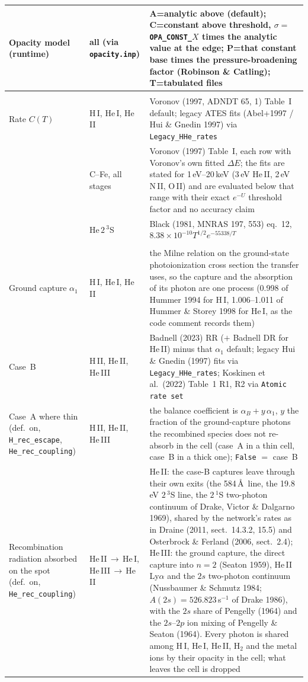 \documentclass[english,a4paper]{my_memo}
\begin{document}
\begin{longtable}{@{}>{\raggedright\arraybackslash\hyphenpenalty=10000\exhyphenpenalty=10000}p{}p{}p{}@{}}
Opacity model (runtime) & all (via \texttt{opacity.inp}) & A=analytic above (default); C=constant above threshold, $\sigma =$ \texttt{OPA\_CONST\_}$X$ times the analytic value at the edge; P=that constant base times the pressure-broadening factor (Robinson \& Catling); T=tabulated files \\
\midrule
\multicolumn{3}{@{}l}{\textbf{Collisional (electron-impact) ionization}}\\[2pt]
Rate $C(T)$ & H\,I, He\,I, He\,II & Voronov (1997, ADNDT 65, 1) Table~I default; legacy ATES fits (Abel+1997 / Hui \& Gnedin 1997) via \texttt{Legacy\_HHe\_rates} \\
 & C--Fe, all stages & Voronov (1997) Table~I, each row with Voronov's own fitted $\Delta E$; the fits are stated for 1\,eV--20\,keV (3\,eV He\,II, 2\,eV N\,II, O\,II) and are evaluated below that range with their exact $e^{-U}$ threshold factor and no accuracy claim \\
 & He\,$2\,^3$S & Black (1981, MNRAS 197, 553) eq.~12, $8.38\times10^{-10}T^{1/2}e^{-55338/T}$ \\
\midrule
\multicolumn{3}{@{}l}{\textbf{Recombination (radiative RR + dielectronic DR)}}\\[2pt]
Ground capture $\alpha_1$ & H\,I, He\,I, He\,II & the Milne relation on the ground-state photoionization cross section the transfer uses, so the capture and the absorption of its photon are one process (0.998 of Hummer 1994 for H\,I, 1.006--1.011 of Hummer \& Storey 1998 for He\,I, as the code comment records them) \\
Case~B & H\,II, He\,II, He\,III & Badnell (2023) RR ($+$ Badnell DR for He\,II) minus that $\alpha_1$ default; legacy Hui \& Gnedin (1997) fits via \texttt{Legacy\_HHe\_rates}; Koskinen et al.\ (2022) Table~1 R1, R2 via \texttt{Atomic rate set} \\
Case~A where thin (def.\ on, \texttt{H\_rec\_escape}, \texttt{He\_rec\_coupling}) & H\,II, He\,II, He\,III & the balance coefficient is $\alpha_B+y\,\alpha_1$, $y$ the fraction of the ground-capture photons the recombined species does not re-absorb in the cell (case~A in a thin cell, case~B in a thick one); \texttt{False} $=$ case~B \\
Recombination radiation absorbed on the spot (def.\ on, \texttt{He\_rec\_coupling}) & He\,II\,$\to$\,He\,I, He\,III\,$\to$\,He\,II & He\,II: the case-B captures leave through their own exits (the 584\,\AA\ line, the 19.8\,eV $2\,^3$S line, the $2\,^1$S two-photon continuum of Drake, Victor \& Dalgarno 1969), shared by the network's rates as in Draine (2011, sect.~14.3.2, 15.5) and Osterbrock \& Ferland (2006, sect.~2.4); He\,III: the ground capture, the direct capture into $n=2$ (Seaton 1959), He\,II Ly$\alpha$ and the $2s$ two-photon continuum (Nussbaumer \& Schmutz 1984; $A(2s)=526.823$\,s$^{-1}$ of Drake 1986), with the $2s$ share of Pengelly (1964) and the $2s$--$2p$ ion mixing of Pengelly \& Seaton (1964). Every photon is shared among H\,I, He\,I, He\,II, H$_2$ and the metal ions by their opacity in the cell; what leaves the cell is dropped \\

\end{longtable}
\end{document}
